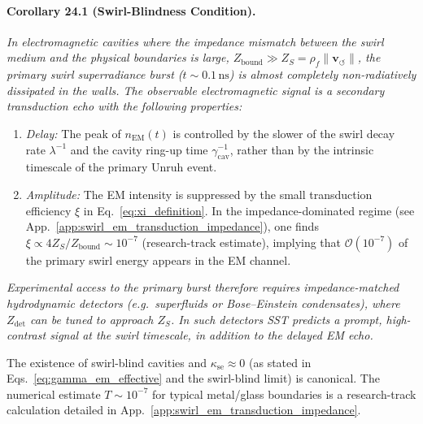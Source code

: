 \documentclass[10pt,reprint,aps,onecolumn,nofootinbib]{revtex4-2}
\newcommand{\vswirl}{\mathbf{v}_{\!\boldsymbol{\circlearrowleft}}}
\newcommand{\rhoF}{\rho_{\!f}}
\begin{document}
        \paragraph*{Corollary 24.1 (Swirl-Blindness Condition).}
            \label{cor:swirl_blindness}
            \emph{
            In electromagnetic cavities where the impedance mismatch between the swirl
            medium and the physical boundaries is large,
            $Z_{\mathrm{bound}} \gg Z_S = \rhoF \lVert\vswirl\rVert$, the primary
            swirl superradiance burst ($t \sim 0.1\,\mathrm{ns}$) is almost completely
            non-radiatively dissipated in the walls. The observable electromagnetic signal
            is a secondary transduction echo with the following properties:
        }

            \begin{enumerate}
                \item \emph{Delay:} The peak of $n_{\mathrm{EM}}(t)$ is controlled by
                the slower of the swirl decay rate $\lambda^{-1}$ and the cavity
                ring-up time $\gamma_{\mathrm{cav}}^{-1}$, rather than by the
                intrinsic timescale of the primary Unruh event.
                \item \emph{Amplitude:} The EM intensity is suppressed by the small
                transduction efficiency $\xi$ in Eq.~\eqref{eq:xi_definition}.
                In the impedance-dominated regime (see App.~\ref{app:swirl_em_transduction_impedance}),
                one finds $\xi \propto 4 Z_S/Z_{\mathrm{bound}} \sim 10^{-7}$ (research-track estimate),
                implying that $\mathcal{O}(10^{-7})$ of the primary swirl energy appears in the
                EM channel.
            \end{enumerate}

            \emph{
            Experimental access to the primary burst therefore requires
            impedance-matched hydrodynamic detectors (e.g.\ superfluids or
            Bose--Einstein condensates), where $Z_{\mathrm{det}}$ can be tuned to
            approach $Z_S$. In such detectors SST predicts a prompt, high-contrast
            signal at the swirl timescale, in addition to the delayed EM echo.
        }

            The existence of swirl-blind cavities and $\kappa_{\text{se}} \approx 0$ (as stated in
            Eqs.~\eqref{eq:gamma_em_effective} and the swirl-blind limit) is canonical. The numerical
            estimate $T \sim 10^{-7}$ for typical metal/glass boundaries is a research-track
            calculation detailed in App.~\ref{app:swirl_em_transduction_impedance}.
\end{document}
